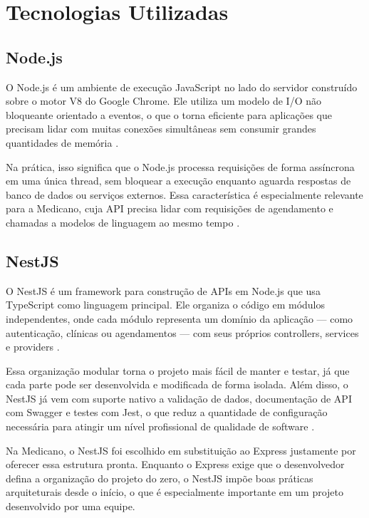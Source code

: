 \section{Tecnologias Utilizadas}
\label{sec:technologies}

\subsection{Node.js}
\label{subsec:nodejs}

O Node.js é um ambiente de execução JavaScript no lado
do servidor construído sobre o motor V8 do Google Chrome.
Ele utiliza um modelo de I/O não bloqueante orientado a
eventos, o que o torna eficiente para aplicações que
precisam lidar com muitas conexões simultâneas sem
consumir grandes quantidades de memória
\cite{tilkov2010}.

Na prática, isso significa que o Node.js processa
requisições de forma assíncrona em uma única thread,
sem bloquear a execução enquanto aguarda respostas de
banco de dados ou serviços externos. Essa característica
é especialmente relevante para a Medicano, cuja API
precisa lidar com requisições de agendamento e chamadas
a modelos de linguagem ao mesmo tempo \cite{tilkov2010}.

\subsection{NestJS}
\label{subsec:nestjs}

O NestJS é um framework para construção de APIs em
Node.js que usa TypeScript como linguagem principal.
Ele organiza o código em módulos independentes, onde
cada módulo representa um domínio da aplicação — como
autenticação, clínicas ou agendamentos — com seus
próprios controllers, services e providers
\cite{nestjs2024}.

Essa organização modular torna o projeto mais fácil
de manter e testar, já que cada parte pode ser
desenvolvida e modificada de forma isolada. Além disso,
o NestJS já vem com suporte nativo a validação de dados,
documentação de API com Swagger e testes com Jest, o
que reduz a quantidade de configuração necessária para
atingir um nível profissional de qualidade de software
\cite{nestjs2024}.

Na Medicano, o NestJS foi escolhido em substituição ao
Express justamente por oferecer essa estrutura pronta.
Enquanto o Express exige que o desenvolvedor defina
a organização do projeto do zero, o NestJS impõe boas
práticas arquiteturais desde o início, o que é
especialmente importante em um projeto desenvolvido
por uma equipe.

